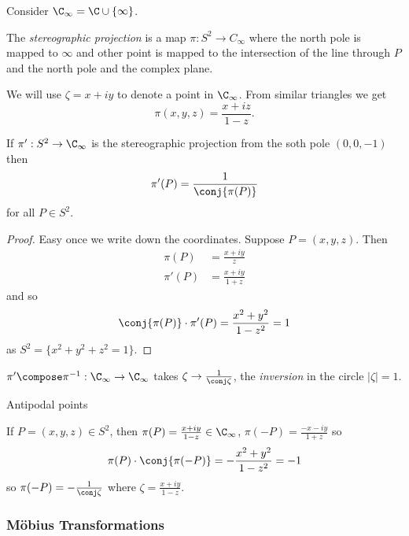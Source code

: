 \documentclass[a4paper]{article}
\theoremstyle{definition}
\begin{document}
Consider \(\C_\infty = \C \cup \{\infty\}\).

\begin{definition}
  The \emph{stereographic projection} is a map \(\pi: S^2 \to C_\infty\) where the north pole is mapped to \(\infty\) and other point is mapped to the intersection of the line through \(P\) and the north pole and the complex plane.
\end{definition}

We will use \(\zeta = x + iy\) to denote a point in \(\C_\infty\). From similar triangles we get
\[
  \pi(x, y, z) = \frac{x + iz}{1 - z}.
\]

\begin{lemma}
  If \(\pi': S^2 \to \C_\infty\) is the stereographic projection from the soth pole \((0, 0, -1)\) then
  \[
    \pi'(P) = \frac{1}{\conj{\pi(P)}}
  \]
  for all \(P \in S^2\).
\end{lemma}

\begin{proof}
  Easy once we write down the coordinates. Suppose \(P = (x, y, z)\). Then
  \begin{align*}
    \pi(P) &= \frac{x + iy}{z} \\
    \pi'(P) &= \frac{x + iy}{1 + z}
  \end{align*}
  and so
  \[
    \conj{\pi(P)} \cdot \pi'(P) = \frac{x^2 + y^2}{1 - z^2} = 1
  \]
  as \(S^2 = \{x^2 + y^2 + z^2 = 1\}\).
\end{proof}

\begin{note}
  \(\pi' \compose \pi^{-1}: \C_\infty \to \C_\infty\) takes \(\zeta \to \frac{1}{\conj \zeta}\), the \emph{inversion} in the circle \(|\zeta| = 1\).
\end{note}

Antipodal points

If \(P = (x, y, z) \in S^2\), then \(\pi(P) = \frac{x + iy}{1 - z} \in \C_\infty\), \(\pi(-P) = \frac{-x - iy}{1 + z}\) so
\[
  \pi(P) \cdot \conj{\pi(-P)} = -\frac{x^2 + y^2}{1 - z^2} = -1
\]
so \(\pi(-P) = -\frac{1}{\conj \zeta}\) where \(\zeta = \frac{x + iy}{1 - z}\).

\subsubsection{Möbius Transformations}
\end{document}
